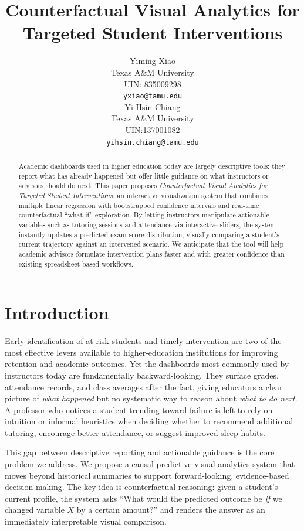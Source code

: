 \documentclass[11pt]{article}
\title{Counterfactual Visual Analytics for Targeted Student Interventions}
\author{Yiming Xiao \\
  Texas A\&M University \\
  UIN: 835009298\\
  \texttt{yxiao@tamu.edu} \\\And
  Yi-Hsin Chiang \\
  Texas A\&M University \\
  UIN:137001082 \\
  \texttt{yihsin.chiang@tamu.edu} \\}
\begin{document}
{\makeatletter\acl@finalcopytrue
  \maketitle
}

\begin{abstract}
Academic dashboards used in higher education today are largely descriptive tools: they report what has already happened but offer little guidance on what instructors or advisors should do next. This paper proposes \textit{Counterfactual Visual Analytics for Targeted Student Interventions}, an interactive visualization system that combines multiple linear regression with bootstrapped confidence intervals and real-time counterfactual ``what-if'' exploration. By letting instructors manipulate actionable variables such as tutoring sessions and attendance via interactive sliders, the system instantly updates a predicted exam-score distribution, visually comparing a student's current trajectory against an intervened scenario. We anticipate that the tool will help academic advisors formulate intervention plans faster and with greater confidence than existing spreadsheet-based workflows.
\end{abstract}

\section{Introduction}

Early identification of at-risk students and timely intervention are two of the most effective levers available to higher-education institutions for improving retention and academic outcomes. Yet the dashboards most commonly used by instructors today are fundamentally backward-looking. They surface grades, attendance records, and class averages after the fact, giving educators a clear picture of \textit{what happened} but no systematic way to reason about \textit{what to do next}. A professor who notices a student trending toward failure is left to rely on intuition or informal heuristics when deciding whether to recommend additional tutoring, encourage better attendance, or suggest improved sleep habits.

This gap between descriptive reporting and actionable guidance is the core problem we address. We propose a causal-predictive visual analytics system that moves beyond historical summaries to support forward-looking, evidence-based decision making. The key idea is counterfactual reasoning: given a student's current profile, the system asks ``What would the predicted outcome be \textit{if} we changed variable $X$ by a certain amount?'' and renders the answer as an immediately interpretable visual comparison.
\end{document}
